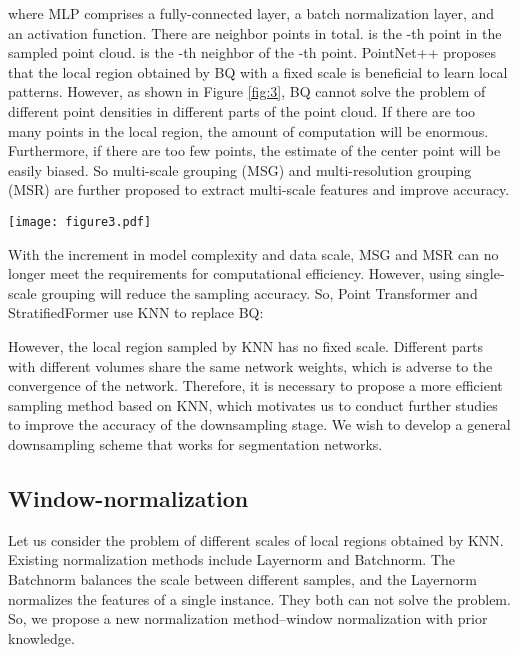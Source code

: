 \documentclass[10pt,twocolumn,letterpaper]{article}
\begin{document}
        where MLP comprises a fully-connected layer, a batch normalization layer, and an activation function. There are  neighbor points in total.  is the -th point in the sampled point cloud.  is the -th neighbor of the -th point. PointNet++ \cite{13Charles_2017} proposes that the local region obtained by BQ with a fixed scale is beneficial to learn local patterns. However, as shown in Figure \ref{fig:3}, BQ cannot solve the problem of different point densities in different parts of the point cloud. If there are too many points in the local region, the amount of computation will be enormous. Furthermore, if there are too few points, the estimate of the center point will be easily biased. So multi-scale grouping (MSG) and multi-resolution grouping (MSR) are further proposed to extract multi-scale features and improve accuracy.
        \begin{figure*}[!htb]
        \centering
        \texttt{[image: figure3.pdf]}
        \caption{Different parts with different point densities have a different number of neighbor points with BQ on a fixed scale. (a) The BQ method will produce more neighbor points in high-density parts. (b) If the density is too low, there will be fewer, even no, points in the local region.}
        \label{fig:3}
        \end{figure*}

        With the increment in model complexity and data scale, MSG and MSR can no longer meet the requirements for computational efficiency. However, using single-scale grouping will reduce the sampling accuracy. So, Point Transformer \cite{24Zhao_2021} and StratifiedFormer \cite{44qq} use KNN to replace BQ:
        

        However, the local region sampled by KNN has no fixed scale. Different parts with different volumes share the same network weights, which is adverse to the convergence of the network. Therefore, it is necessary to propose a more efficient sampling method based on KNN, which motivates us to conduct further studies to improve the accuracy of the downsampling stage. We wish to develop a general downsampling scheme that works for segmentation networks.

    \subsection{Window-normalization}
        Let us consider the problem of different scales of local regions obtained by KNN. Existing normalization methods include Layernorm and Batchnorm. The Batchnorm balances the scale between different samples, and the Layernorm normalizes the features of a single instance. They both can not solve the problem. So, we propose a new normalization method--window normalization with prior knowledge.
\end{document}
